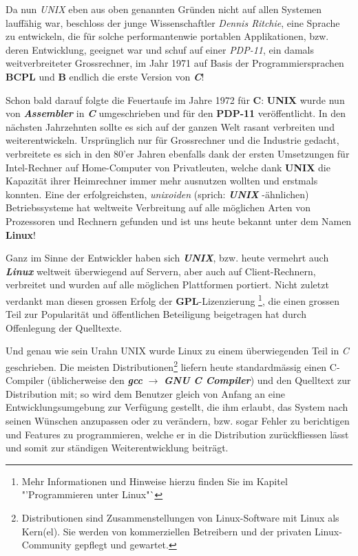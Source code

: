 \documentclass[b5paper,10pt,dvips,fleqn,titlepage,twoside]{book}
\begin{document}
Da nun \emph{UNIX} eben aus oben genannten Gründen nicht auf allen Systemen lauffähig war, beschloss der junge Wissenschaftler \emph{Dennis Ritchie}, eine Sprache zu entwickeln, die für solche performantenwie portablen Applikationen, bzw. deren Entwicklung, geeignet war und schuf auf einer \emph{PDP-11}, ein damals weitverbreiteter Grossrechner, im Jahr 1971 auf Basis der Programmiersprachen \textbf{BCPL} und \textbf{B} endlich die erste Version von \emph{\textbf{C}}!

Schon bald darauf folgte die Feuertaufe im Jahre 1972 für \textbf{C}: \textbf{UNIX} wurde nun von \emph{\textbf{Assembler}} in \emph{\textbf{C}} umgeschrieben und für den \textbf{PDP-11} veröffentlicht.\newline
In den nächsten Jahrzehnten sollte es sich auf der ganzen Welt rasant verbreiten und weiterentwickeln. Ursprünglich nur für Grossrechner und die Industrie gedacht, verbreitete es sich in den 80'er Jahren ebenfalls dank der ersten Umsetzungen für Intel-Rechner auf Home-Computer von Privatleuten, welche dank \textbf{UNIX} die Kapazität ihrer Heimrechner immer mehr ausnutzen wollten und erstmals konnten. Eine der erfolgreichsten, \textit{unixoiden} (sprich: \emph{\textbf{UNIX}	}-ähnlichen) Betriebssysteme hat weltweite Verbreitung auf alle möglichen Arten von Prozessoren und Rechnern gefunden und ist uns heute bekannt unter dem Namen \textbf{Linux}!

Ganz im Sinne der Entwickler haben sich \emph{\textbf{UNIX}}, bzw. heute vermehrt auch \emph{\textbf{Linux}} weltweit überwiegend auf Servern, aber auch auf Client-Rechnern, verbreitet und wurden auf alle möglichen Plattformen portiert. Nicht zuletzt verdankt man diesen grossen Erfolg  der \textbf{GPL}-Lizenzierung \footnote{Mehr Informationen und Hinweise hierzu finden Sie im Kapitel "'Programmieren unter Linux"`}, die einen grossen Teil zur Popularität und öffentlichen Beteiligung beigetragen hat durch Offenlegung der Quelltexte.

Und genau wie sein Urahn UNIX wurde Linux zu einem überwiegenden Teil in \emph{C} geschrieben.
Die meisten Distributionen\footnote{Distributionen sind Zusammenstellungen von Linux-Software mit Linux als Kern(el). Sie werden von kommerziellen Betreibern und der privaten Linux-Community gepflegt und gewartet.} liefern heute standardmässig einen C-Compiler (üblicherweise den \emph{\textbf{gcc}} $\rightarrow$ \emph{\textbf{GNU C Compiler}}) und den Quelltext zur Distribution mit; so wird dem Benutzer gleich von Anfang an eine Entwicklungsumgebung zur Verfügung gestellt, die ihm erlaubt, das System nach seinen Wünschen anzupassen oder zu verändern, bzw. sogar Fehler zu berichtigen und Features zu programmieren, welche er in die Distribution zurückfliessen lässt und somit zur ständigen Weiterentwicklung beiträgt.
\end{document}
